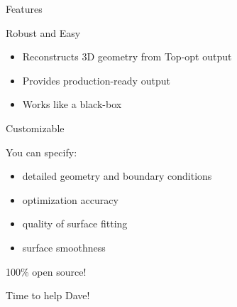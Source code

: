 \begin{frame}{Features}
	\begin{block}{Robust and Easy}{
			\begin{itemize}
				\item Reconstructs 3D geometry from Top-opt output
				\item Provides production-ready output
				\item Works like a black-box
			\end{itemize}
		}
	\end{block}
	\begin{block}{Customizable}{
			You can specify:
			\begin{itemize}
				\item detailed geometry and boundary conditions
				\item optimization accuracy
				\item quality of surface fitting
				\item surface smoothness
			\end{itemize}
		}
	\end{block}
	\begin{block}{100\% open source!}{
		}
	\end{block}
\end{frame}

\begin{frame}{Time to help Dave!}
\end{frame}